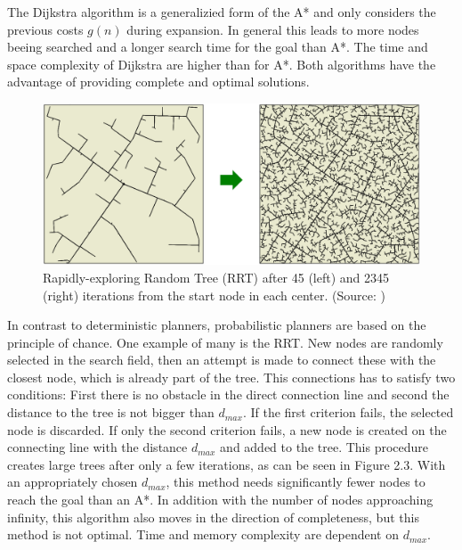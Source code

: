 The Dijkstra algorithm \cite{dijkstra_note_1959} is a generalizied form of the A* and only considers the previous costs \(g(n)\) during expansion. In general this leads to more nodes beeing searched and a longer search time for the goal than A*. The time and space complexity of Dijkstra are higher than for A*. Both algorithms have the advantage of providing complete and optimal solutions.

\begin{figure}[h]
    \centering
    \includegraphics[width=1\textwidth]{figures/20_state_of_the_art/rrt.png}
    \caption[The RRT algorithm]{Rapidly-exploring Random Tree (RRT) after 45 (left) and 2345 (right) iterations from the start node in each center. (Source: \cite{burgard_introduction_2021})}
    \label{fig:rrt}
\end{figure}

In contrast to deterministic planners, probabilistic planners are based on the principle of chance. One example of many is the RRT. New nodes are randomly selected in the search field, then an attempt is made to connect these with the closest node, which is already part of the tree. This connections has to satisfy two conditions: First there is no obstacle in the direct connection line and second the distance to the tree is not bigger than \(d_{max}\). If the first criterion fails, the selected node is discarded. If only the second criterion fails, a new node is created on the connecting line with the distance \(d_{max}\) and added to the tree. This procedure creates large trees after only a few iterations, as can be seen in Figure 2.3. With an appropriately chosen \(d_{max}\), this method needs significantly fewer nodes to reach the goal than an A*. In addition with the number of nodes approaching infinity, this algorithm also moves in the direction of completeness, but this method is not optimal. Time and memory complexity are dependent on \(d_{max}\).


